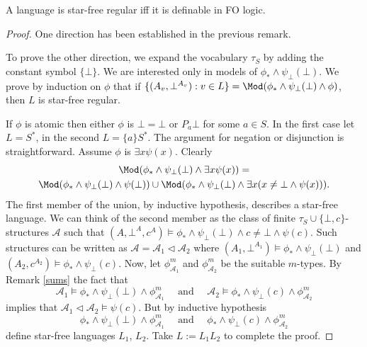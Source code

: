 \begin{thm} A language is star-free regular iff it is definable in FO logic.
\begin{proof} One direction has been established in the previous remark. 

To prove the other direction, we expand the vocabulary $\tau_S$ by adding the constant symbol $\{\bot\}$. We are interested only in models of $\phi_{\ast} \land \psi_{\bot}(\bot)$. 
We prove by induction on $\phi$ that if $\{(A_v, \bot^{A_v}) : v \in L\}=\Mod(\phi_{\ast} \land \psi_{\bot}(\bot) \land \phi)$, then $L$ is star-free regular. 

If $\phi$ is atomic then either $\phi$ is $\bot=\bot$ or $P_a\bot$ for some $a \in S$. 
In the first case let $L=S^{\ast}$, in the second $L=\{a\}S^{\ast}$. 
The argument for negation or disjunction is straightforward.
Assume $\phi$ is $\exists x \psi (x)$. Clearly 
\begin{multline*}
\Mod(\phi_{\ast} \land \psi_{\bot}(\bot) \land \exists x \psi (x))=\\ \Mod(\phi_{\ast} \land \psi_{\bot}(\bot) \land \psi (\bot)) \cup \Mod(\phi_{\ast} \land \psi_{\bot}(\bot) \land \exists x (x\neq \bot \land \psi (x)))\text{.}
\end{multline*}
The first member of the union, by inductive hypothesis, describes a star-free language. 
We can think of the second member as the class of finite $\tau_S \cup \{\bot, c\}$-structures $\mathcal{A}$ such that 
$(A, \bot^A, c^A) \models \phi_{\ast} \land \psi_{\bot}(\bot) \land c\neq \bot \land \psi (c)$. 
Such structures can be written as $\mathcal{A} = \mathcal{A}_1 \triangleleft \mathcal{A}_2$ where $(A_1, \bot^{A_1}) \models \phi_{\ast} \land \psi_{\bot}(\bot)$ and $(A_2, c^{A_2}) \models \phi_{\ast} \land \psi_{\bot}(c)$. 
Now, let $\phi^m _{\mathcal{A}_1}$ and $\phi^m _{\mathcal{A}_2}$  be the suitable $m$-types. 
By Remark \ref{sums} the fact that $$\mathcal{A}_1 \models \phi_{\ast} \land \psi_{\bot}(\bot) \land \phi^m _{\mathcal{A}_1} \quad \text{ and } \quad \mathcal{A}_2 \models \phi_{\ast} \land \psi_{\bot}(c) \land \phi^m _{\mathcal{A}_2}$$ implies that $\mathcal{A}_1 \triangleleft \mathcal{A}_2 \models \psi(c)$. 
But by inductive hypothesis 
$$\phi_{\ast} \land \psi_{\bot}(\bot) \land \phi^m _{\mathcal{A}_1} \quad \text{ and } \quad  \phi_{\ast} \land \psi_{\bot}(c) \land \phi^m _{\mathcal{A}_2}$$ define star-free languages $L_1$, $L_2$. 
Take $L:=L_1L_2 $ to complete the proof. 
\end{proof}
\end{thm}
